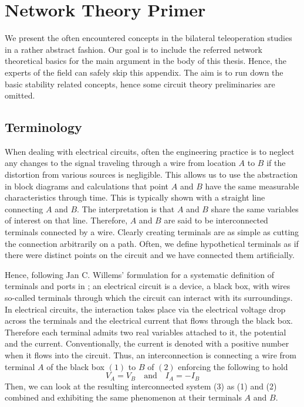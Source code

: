 \chapter{Network Theory Primer}
\label{chap:apdxnetwork}


We present the often encountered concepts in the bilateral teleoperation studies in a rather abstract fashion. Our goal is to
include the referred network theoretical basics for the main argument in the body of this thesis. Hence, the experts of the field can 
safely skip this appendix. The aim is to run down the basic stability related concepts, hence some circuit theory preliminaries 
are omitted.

\section{Terminology}
When dealing with electrical circuits, often the engineering practice is to neglect any changes to the signal traveling through 
a wire from location $A$ to $B$ if the distortion from various sources
is negligible. This allows us to use the abstraction in block diagrams and calculations that point
$A$ and $B$ have the same measurable characteristics through time. This is typically shown with a 
straight line connecting $A$ and $B$. The interpretation is that $A$ and $B$ share the same variables of 
interest on that line. Therefore, $A$ and $B$ are said to be interconnected terminals connected by a wire. 
Clearly creating terminals are as simple as cutting the connection arbitrarily on a path. Often, we define 
hypothetical terminals as if there were distinct points on the circuit and we have connected them artificially. 

Hence, following Jan C. Willems' formulation for a systematic definition of terminals and ports in \cite{willemsCSM}; 
an electrical circuit is a device, a black box, with wires so-called terminals
through which the circuit can interact with its surroundings. In electrical circuits, the interaction takes place
via the electrical voltage drop across the terminals and the electrical current that flows through the black box.
Therefore each terminal admits two real variables attached to it, the potential and the current. Conventionally, 
the current is denoted with a positive number when it flows into the circuit. Thus, an interconnection is connecting
a wire from terminal $A$ of the black box $(1)$ to $B$ of $(2)$ enforcing the following to hold
\[
V_A = V_B \quad \text{and} \quad I_A=-I_B
\]
Then, we can look at the resulting interconnected system (3) as (1) and (2) combined and exhibiting the same
phenomenon at their terminals $A$ and $B$. 

